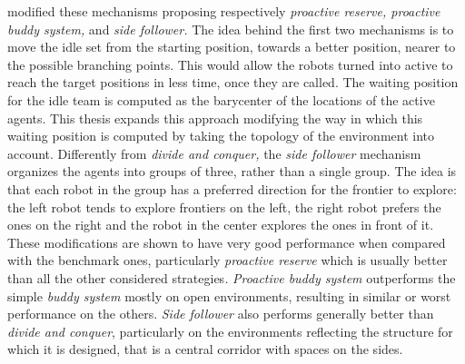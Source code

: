 \cite{Cattaneo2017} modified these mechanisms proposing respectively
\emph{proactive reserve, proactive buddy system, }and \emph{side follower.
}The idea behind the first two mechanisms is to move the idle set
from the starting position, towards a better position, nearer to the
possible branching points. This would allow the robots turned into
active to reach the target positions in less time, once they are called.
The waiting position for the idle team is computed as the barycenter
of the locations of the active agents. This thesis expands this approach
modifying the way in which this waiting position is computed by taking
the topology of the environment into account. Differently from \emph{divide
and conquer, }the \emph{side follower }mechanism organizes the agents
into groups of three, rather than a single group. The idea is that
each robot in the group has a preferred direction for the frontier
to explore: the left robot tends to explore frontiers on the left,
the right robot prefers the ones on the right and the robot in the
center explores the ones in front of it. These modifications are shown
to have very good performance when compared with the benchmark ones,
particularly \emph{proactive reserve }which is usually better than
all the other considered strategies\emph{.} \emph{Proactive buddy
system }outperforms the simple \emph{buddy system }mostly on open
environments, resulting in similar or worst performance on the others.
\emph{Side follower }also performs generally better than \emph{divide
and conquer}, particularly on the environments reflecting the structure
for which it is designed, that is a central corridor with spaces on
the sides.
